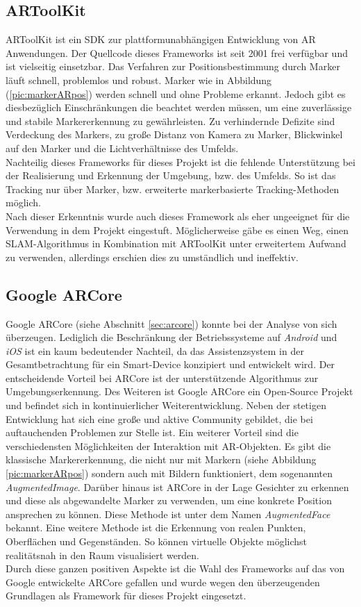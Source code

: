 \subsection{ARToolKit}
ARToolKit ist ein \acs{SDK} zur plattformunabhängigen Entwicklung von \acl{AR} Anwendungen. Der Quellcode dieses Frameworks ist seit 2001 
frei verfügbar und ist vielseitig einsetzbar. Das Verfahren zur Positionsbestimmung durch Marker läuft schnell, problemlos und robust. Marker wie in 
Abbildung (\ref{pic:markerARpos}) werden schnell und ohne Probleme erkannt. Jedoch gibt es diesbezüglich Einschränkungen die beachtet werden 
müssen, um eine zuverlässige und stabile Markererkennung zu gewährleisten. Zu verhindernde Defizite sind Verdeckung des Markers, zu große Distanz 
von Kamera zu Marker, Blickwinkel auf den Marker und die Lichtverhältnisse des Umfelds. 
\\ 
Nachteilig dieses Frameworks für dieses Projekt ist die fehlende Unterstützung bei der Realisierung und Erkennung der Umgebung, bzw. des Umfelds.
So ist das Tracking nur über Marker, bzw. erweiterte markerbasierte Tracking-Methoden möglich. 
\\ %
Nach dieser Erkenntnis wurde auch dieses Framework als eher ungeeignet für die Verwendung in dem Projekt eingestuft. Möglicherweise 
gäbe es einen Weg, einen \acs{SLAM}-Algorithmus in Kombination mit ARToolKit unter erweitertem Aufwand zu verwenden, allerdings 
erschien dies zu umständlich und ineffektiv. 
\subsection{Google ARCore}
Google ARCore (siehe Abschnitt \ref{sec:arcore}) konnte bei der Analyse von sich überzeugen. Lediglich die Beschränkung der
Betriebssysteme auf \textit{Android} und \textit{iOS} ist ein kaum bedeutender Nachteil, da das Assistenzsystem in der Gesamtbetrachtung 
für ein Smart-Device konzipiert und entwickelt wird. Der entscheidende Vorteil bei 
ARCore ist der unterstützende Algorithmus zur Umgebungserkennung. Des Weiteren ist Google ARCore ein Open-Source Projekt und befindet sich 
in kontinuierlicher Weiterentwicklung. Neben der stetigen Entwicklung hat sich eine große und aktive Community gebildet, die bei auftauchenden 
Problemen zur Stelle ist. Ein weiterer Vorteil sind die verschiedensten Möglichkeiten der Interaktion mit \acs{AR}-Objekten. Es gibt die 
klassische Markererkennung, die nicht nur mit Markern (siehe Abbildung \ref{pic:markerARpos}) sondern auch mit Bildern funktioniert, dem sogenannten
\textit{AugmentedImage}. Darüber hinaus ist ARCore in der Lage Gesichter zu erkennen und diese als abgewandelte Marker zu verwenden, um eine konkrete 
Position ansprechen zu können. Diese Methode ist unter dem Namen \textit{AugmentedFace} bekannt. Eine weitere Methode ist die Erkennung von 
realen Punkten, Oberflächen und Gegenständen. So können virtuelle Objekte möglichst realitätsnah in den Raum visualisiert werden.
\\
\linebreak
Durch diese ganzen positiven Aspekte ist die Wahl des Frameworks auf das von Google entwickelte ARCore gefallen und wurde wegen den überzeugenden 
Grundlagen als Framework für dieses Projekt eingesetzt.

